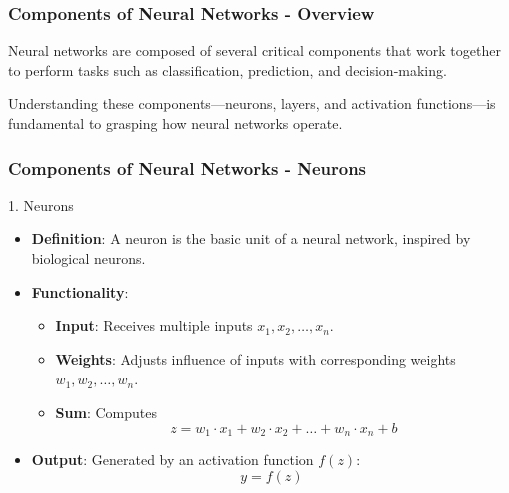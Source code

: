 \documentclass[aspectratio=169]{beamer}
\begin{document}
\begin{frame}[fragile]
    \frametitle{Components of Neural Networks - Overview}
    Neural networks are composed of several critical components that work together to perform tasks such as classification, prediction, and decision-making.
    
    Understanding these components—neurons, layers, and activation functions—is fundamental to grasping how neural networks operate.
\end{frame}

\begin{frame}[fragile]
    \frametitle{Components of Neural Networks - Neurons}
    \begin{block}{1. Neurons}
        \begin{itemize}
            \item \textbf{Definition}: A neuron is the basic unit of a neural network, inspired by biological neurons.
            \item \textbf{Functionality}:
            \begin{itemize}
                \item \textbf{Input}: Receives multiple inputs $x_1, x_2, \ldots, x_n$.
                \item \textbf{Weights}: Adjusts influence of inputs with corresponding weights $w_1, w_2, \ldots, w_n$.
                \item \textbf{Sum}: Computes 
                \begin{equation}
                z = w_1 \cdot x_1 + w_2 \cdot x_2 + \ldots + w_n \cdot x_n + b
                \end{equation}
            \end{itemize}
            \item \textbf{Output}: Generated by an activation function $f(z)$:
            \begin{equation}
            y = f(z)
            \end{equation}
        \end{itemize}
    \end{block}
\end{frame}
\end{document}
